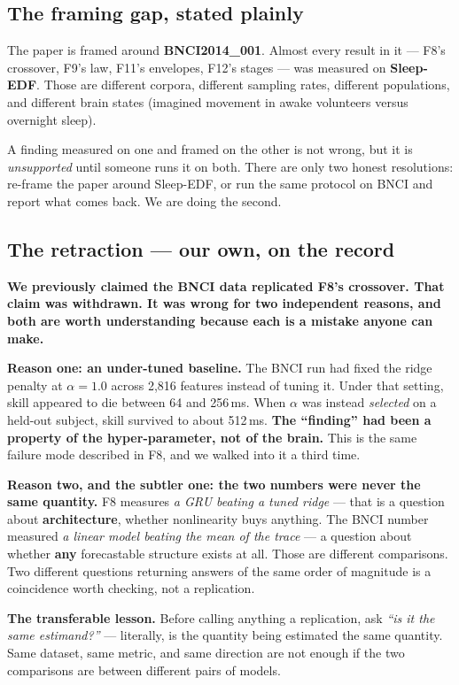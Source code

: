 \documentclass[11pt]{article}
\begin{document}
\subsection{The framing gap, stated plainly}

The paper is framed around \textbf{BNCI2014\_001}. Almost every result in it ---
F8's crossover, F9's law, F11's envelopes, F12's stages --- was measured on
\textbf{Sleep-EDF}. Those are different corpora, different sampling rates,
different populations, and different brain states (imagined movement in awake
volunteers versus overnight sleep).

A finding measured on one and framed on the other is not wrong, but it is
\emph{unsupported} until someone runs it on both. There are only two honest
resolutions: re-frame the paper around Sleep-EDF, or run the same protocol on
BNCI and report what comes back. We are doing the second.

\subsection{The retraction --- our own, on the record}

\textbf{We previously claimed the BNCI data replicated F8's crossover. That claim
was withdrawn. It was wrong for two independent reasons, and both are worth
understanding because each is a mistake anyone can make.}

\textbf{Reason one: an under-tuned baseline.} The BNCI run had fixed the ridge
penalty at $\alpha = 1.0$ across 2{,}816 features instead of tuning it. Under
that setting, skill appeared to die between 64 and 256\,ms. When $\alpha$ was
instead \emph{selected} on a held-out subject, skill survived to about 512\,ms.
\textbf{The ``finding'' had been a property of the hyper-parameter, not of the
brain.} This is the same failure mode described in F8, and we walked into it a
third time.

\textbf{Reason two, and the subtler one: the two numbers were never the same
quantity.} F8 measures \emph{a GRU beating a tuned ridge} --- that is a question
about \textbf{architecture}, whether nonlinearity buys anything. The BNCI number
measured \emph{a linear model beating the mean of the trace} --- a question about
whether \textbf{any} forecastable structure exists at all. Those are different
comparisons. Two different questions returning answers of the same order of
magnitude is a coincidence worth checking, not a replication.

\begin{keybox}
\textbf{The transferable lesson.} Before calling anything a replication, ask
\emph{``is it the same estimand?''} --- literally, is the quantity being estimated
the same quantity. Same dataset, same metric, and same direction are not enough
if the two comparisons are between different pairs of models.
\end{keybox}
\end{document}
